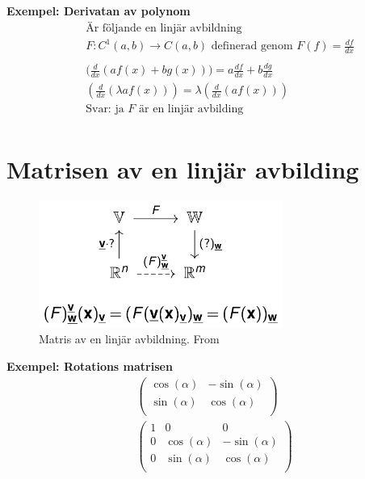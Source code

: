 \begin{multicols}{2}
\textbf{Exempel: Derivatan av polynom}
\begin{align*}
  &\quad  \text{Är följande en linjär avbildning } \\
  &\quad  F:C^1(a,b)\to{C}(a,b) \text{ definerad genom } F(f)=\frac{df}{dx}  \\
  &\quad  \\
  &\quad  \big( \frac{d}{dx}(af(x) + bg(x)) \big) = a\frac{df}{dx} + b\frac{dg}{dx} \\
  &\quad  ( \frac{d}{dx}(\lambda af(x)) ) = \lambda  ( \frac{d}{dx}(af(x)) ) \\
  &\quad  \text{Svar: ja $F$ är en linjär avbilding} \\
\end{align*}


\section{Matrisen av en linjär avbilding}
\begin{figure}[H]
    \centering
    \includegraphics[width=8cm]{image/matris_lin_avb.png} 
    \caption{Matris av en linjär avbildning. From \cite{laII}}
\end{figure}

\textbf{Exempel: Rotations matrisen}
\begin{align*}
  &\left(\begin{array}{cc}
    \cos(\alpha) & -\sin(\alpha)   \\
    \sin(\alpha) &  \cos(\alpha)   \\
  \end{array}\right)  \\
  &\left(\begin{array}{ccc}
    1 & 0            & 0               \\
    0 & \cos(\alpha) & -\sin(\alpha)   \\
    0 & \sin(\alpha) &  \cos(\alpha)   \\
  \end{array}\right)
\end{align*}



\end{multicols}

